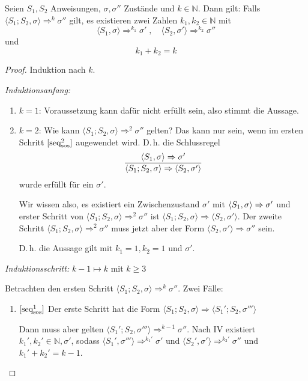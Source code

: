 \begin{lemma}
    Seien $S_1, S_2$ Anweisungen, $\sigma, \sigma''$ Zustände und $k \in \mathbb{N}$.
    Dann gilt: Falls $\langle S_1; S_2, \sigma \rangle \Rightarrow^k \sigma''$ gilt, es existieren zwei Zahlen $k_1, k_2 \in \mathbb{N}$ mit
    \[
        \langle S_1, \sigma \rangle \Rightarrow^{k_1} \sigma'
        \;,\quad
        \langle S_2, \sigma' \rangle \Rightarrow^{k_2} \sigma''
    \]
    und
    \[
        k_1 + k_2 = k
    \]
\end{lemma}
\begin{proof}
    Induktion nach $k$.

    \emph{Induktionsanfang:}
    \begin{enumerate}
        \item $k = 1$: Voraussetzung kann dafür nicht erfüllt sein, also stimmt die Aussage.
        \item $k = 2$: Wie kann $\langle S_1; S_2, \sigma \rangle \Rightarrow^2 \sigma''$ gelten?
            Das kann nur sein, wenn im ersten Schritt $\infruleSos[2]{seq}$ augewendet wird. D.\,h. die Schlussregel
            \[
                \frac{\stranssos{S_1}{\sigma}{\sigma'}}{\stranssos{S_1; S_2}{\sigma}{\langle S_2, \sigma' \rangle}}
            \]
            wurde erfüllt für ein $\sigma'$.

            Wir wissen also, es existiert ein Zwischenzustand $\sigma'$ mit $\stranssos{S_1}{\sigma}{\sigma'}$ und erster Schritt von $\langle S_1; S_2, \sigma \rangle \Rightarrow^2 \sigma''$ ist $\langle S_1; S_2, \sigma \rangle \Rightarrow \langle S_2, \sigma' \rangle$.
            Der zweite Schritt $\langle S_1; S_2, \sigma \rangle \Rightarrow^2 \sigma''$ muss jetzt aber der Form $\langle S_2, \sigma' \rangle \Rightarrow \sigma''$ sein.

            D.\,h. die Aussage gilt mit $k_1 = 1, k_2 = 1$ und $\sigma'$.
    \end{enumerate}

        \par\bigskip
    \emph{Induktionsschritt:} $k - 1 \mapsto k$ mit $k \geq 3$

    Betrachten den ersten Schritt $\langle S_1; S_2, \sigma \rangle \Rightarrow^k \sigma''$.
    Zwei Fälle:
    \begin{enumerate}
        \item $\infruleSos[1]{seq}$ Der erste Schritt hat die Form $\langle S_1; S_2, \sigma \rangle \Rightarrow \langle S_1'; S_2, \sigma''' \rangle$

            Dann muss aber gelten $\langle S_1'; S_2, \sigma''' \rangle \Rightarrow^{k-1} \sigma''$.
            Nach IV existiert $k_1', k_2' \in \mathbb{N}, \sigma'$, sodass $\langle S_1',  \sigma''' \rangle \Rightarrow^{k_1'} \sigma'$ und $\langle S_2',  \sigma' \rangle \Rightarrow^{k_2'} \sigma''$ und $k_1' + k_2' = k - 1$.


\end{enumerate}
\end{proof}
